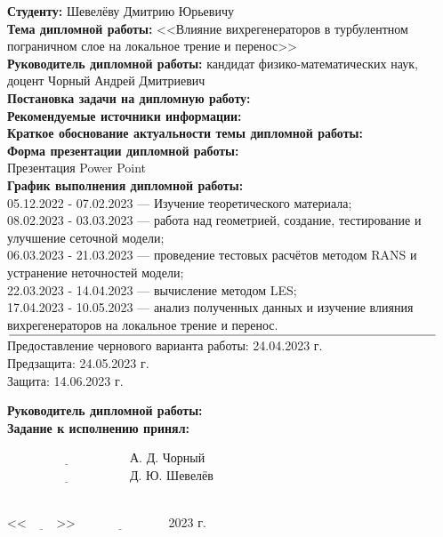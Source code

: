 \documentclass[a4paper]{extreport}
\begin{document}
	\begin{flushleft}
		\textbf{Студенту:} Шевелёву Дмитрию Юрьевичу\\
		\textbf{Тема дипломной работы:} <<Влияние вихрегенераторов в турбулентном пограничном слое на локальное трение и перенос>>\\
		\textbf{Руководитель дипломной работы:} кандидат физико-математических наук, доцент Чорный Андрей Дмитриевич\\
		\textbf{Постановка задачи на дипломную работу:}\\
		\textbf{Рекомендуемые источники информации:}\\
		\textbf{Краткое обоснование актуальности темы дипломной работы:}\\
		\textbf{Форма презентации дипломной работы:}\\
		Презентация Power Point\\
		\textbf{График выполнения дипломной работы:}\\
		05.12.2022 - 07.02.2023 --- Изучение теоретического материала;\\
		08.02.2023 - 03.03.2023 --- работа над геометрией, создание, тестирование и улучшение сеточной модели;\\
		06.03.2023 - 21.03.2023 --- проведение тестовых расчётов методом RANS и устранение неточностей модели;\\
		22.03.2023 - 14.04.2023 --- вычисление методом LES;\\
		17.04.2023 - 10.05.2023 --- анализ полученных данных и изучение влияния вихрегенераторов на локальное трение и перенос.\\
		$\underline{\hspace{\textwidth}}$
		Предоставление чернового варианта работы: 24.04.2023 г.\\
		Предзащита: 24.05.2023 г.\\
		Защита: 14.06.2023 г.\\
	\end{flushleft}
	\begin{minipage}{0.5\textwidth}
		\textbf{Руководитель дипломной работы:}\\
		\textbf{Задание к исполнению принял:}\\
	\end{minipage}
	\hfill
	\begin{minipage}{0.5\textwidth}
		$\underline{\hspace{4cm}}$ А. Д. Чорный\\
		$\underline{\hspace{4cm}}$ Д. Ю. Шевелёв\\
	\end{minipage}
	\\
	<<$\underline{\hspace{1cm}}$>>$\underline{\hspace{3cm}}$ 2023 г.\\
\end{document}

